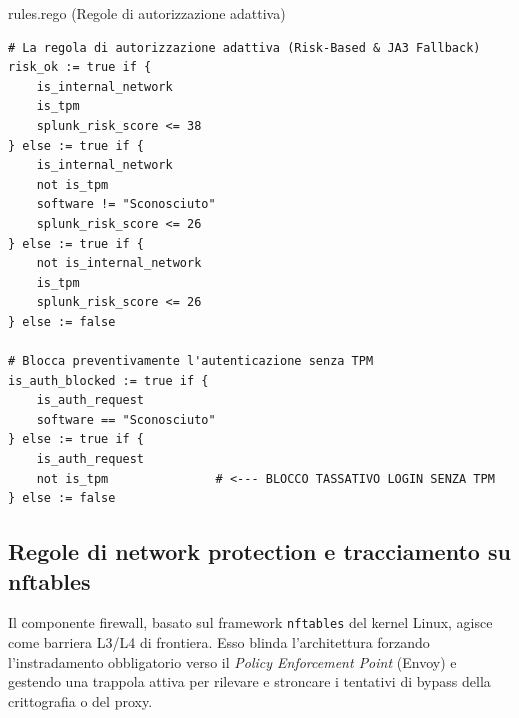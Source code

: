 \begin{center}
\begin{minipage}{\linewidth}
\begin{ztacodebox}{rules.rego (Regole di autorizzazione adattiva)}
\begin{lstlisting}[language=Rego]
# La regola di autorizzazione adattiva (Risk-Based & JA3 Fallback)
risk_ok := true if {
    is_internal_network
    is_tpm
    splunk_risk_score <= 38
} else := true if {
    is_internal_network
    not is_tpm
    software != "Sconosciuto"
    splunk_risk_score <= 26
} else := true if {
    not is_internal_network
    is_tpm
    splunk_risk_score <= 26
} else := false

# Blocca preventivamente l'autenticazione senza TPM
is_auth_blocked := true if {
    is_auth_request
    software == "Sconosciuto"
} else := true if {
    is_auth_request
    not is_tpm               # <--- BLOCCO TASSATIVO LOGIN SENZA TPM
} else := false
\end{lstlisting}
\end{ztacodebox}
\label{lst:rego_adaptive_rules}
\end{minipage}
\end{center}

\subsection{Regole di network protection e tracciamento su nftables}
Il componente firewall, basato sul framework \texttt{nftables} del kernel Linux, agisce come barriera L3/L4 di frontiera. Esso blinda l'architettura forzando l'instradamento obbligatorio verso il \textit{Policy Enforcement Point} (Envoy) e gestendo una trappola attiva per rilevare e stroncare i tentativi di bypass della crittografia o del proxy.

